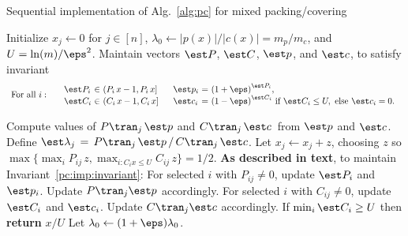 \begin{algorithm}[t]
  \caption{Sequential implementation 
    of Alg.~\ref{alg:pc}\label{alg:pc:imp}
    for mixed packing/covering \LPs}
  \begin{algorithmic}[1]
    \State Initialize $x_{j} \gets 0$ for $j\in [n]$,
    $\lambda_0 \gets |p(x)|/|c(x)| = m_p/m_c$,
    and $U = \ln(m)/\eps^2$.
    \State\label{pc:imp:estimate1} 
    Maintain vectors $\est P$, $\est C$, $\est p$, and $\est c$, to satisfy invariant
    \vspace*{-1.5ex}
    \begin{equation}\label{pc:imp:invariant}
      \begin{array}{ll}
        \text{For all } i:
        &
        \begin{array}{@{~~~}l@{~}l@{~}l@{~~~~~}l@{~}l@{~}l}
          \est P_i  &\in& (P_i\, x - 1, P_i\,x]
          &
          \est p_i &=& {(1+\eps)}^{\est P_i},
          \\[0pt]
          \est C_i &\in& (C_i \,x - 1, C_i\, x]
          &
          \est c_i &=& {(1-\eps)}^{\est C_i} \text{ if } \est C_i \le U, \text{ else } \est c_i=0.
        \end{array}
      \end{array}
      \vspace*{-0.39in}
    \end{equation}

    \State
    \Repeat
    \State\label{pc:imp:lambda}\label{pc:imp:b}Compute values
    of $P\tran_j\, \est p$ 
    and $C\tran_j\, \est c\,$ 
    from $\est p$ and $\est c$.
    Define $\est \lambda_j\,=\, P\tran_j\, \est p \,/\, C\tran_j\, \est c$.
    \label{op:aj}
    \State\label{pc:imp:z} Let $x_j \gets x_j + z$, 
    choosing $z$ 
    so $\max\{ \max_i P_{ij}\,z, \max_{i: C_i x\le U} C_{ij}\,z\} = 1/2$.
    \Block\label{pc:imp:estimate3} \textbf{As described in text}, 
    to maintain Invariant~\eqref{pc:imp:invariant}:
    \State\label{pc:imp:estimate4} For selected $i$ with $P_{ij}\ne 0$,
    update $\est P_i$ and
    $\est p_i$.  Update $P\tran_j \est p$ accordingly.
    \State\label{pc:imp:estimate5} For selected $i$ with $C_{ij}\ne 0$,
    update $\est C_i$ and $\est c_i$.
    Update $ C\tran_j \est c$ accordingly.
    \EndBlock
    \State If $\min_{i} \est C_i \ge U$ then {\bf return} $x/U$ 
    \label{pc:imp:return}
    \EndBlock\label{pc:imp:b:end}
    \EndWhile 
    \EndFor
    \State Let $\lambda_0 \gets (1+\eps)\lambda_0$.\label{pc:imp:a}
\EndBlock
    \EndRepeat
    \EndFunction 
  \end{algorithmic}
\end{algorithm}

